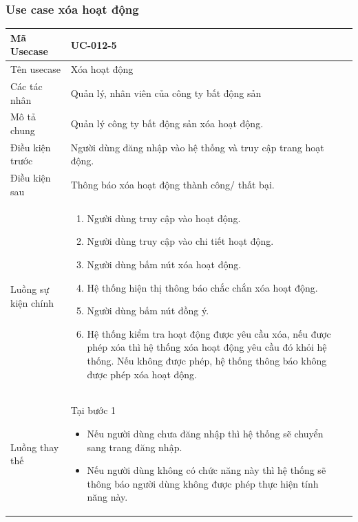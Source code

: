 \documentclass[12pt,a4paper]{article}
\begin{document}
    \subsubsection*{Use case xóa hoạt động }
    \begin{table}[H]
        \centering
        \begin{tabular}{|p{3.5cm}|p{11.5cm}|c|}
            \hline
            Mã Usecase      & UC-012-5                                                       \\
            \hline
            Tên usecase     & Xóa hoạt động                                                  \\
            \hline
            Các tác nhân    & Quản lý, nhân viên của công ty bất động sản                    \\
            \hline
            Mô tả chung     & Quản lý công ty bất động sản xóa hoạt động.                    \\
            \hline

            Điều kiện trước & Người dùng đăng nhập vào hệ thống và truy cập trang hoạt động. \\
            \hline

            Điều kiện sau   & Thông báo xóa hoạt động thành công/ thất bại.                  \\
            \hline

            Luồng sự kiện chính & \vspace{-.8cm}\begin{enumerate}
                                                    \item Người dùng truy cập vào hoạt động.
                                                    \item Người dùng truy cập vào chi tiết hoạt động.
                                                    \item  Người dùng bấm nút xóa hoạt động.
                                                    \item  Hệ thống hiện thị thông báo chắc chắn xóa hoạt động.
                                                    \item  Người dùng bấm nút đồng ý.
                                                    \item Hệ thống kiểm tra hoạt động được yêu cầu xóa, nếu được phép xóa thì hệ thống xóa hoạt động yêu cầu đó khỏi hệ thống. Nếu không được phép, hệ thống thông báo không được phép xóa hoạt động.
            \end{enumerate}
            \\
            \hline
            Luồng thay thế & Tại bước 1\newline
            \vspace{-.8cm}\begin{itemize}
                              \item Nếu người dùng chưa đăng nhập thì hệ thống sẽ chuyển sang trang đăng nhập.
                              \item Nếu người dùng không có chức năng này thì hệ thống sẽ thông báo người dùng không được phép thực hiện tính năng này.
            \end{itemize}


\end{tabular}
\end{table}
\end{document}

